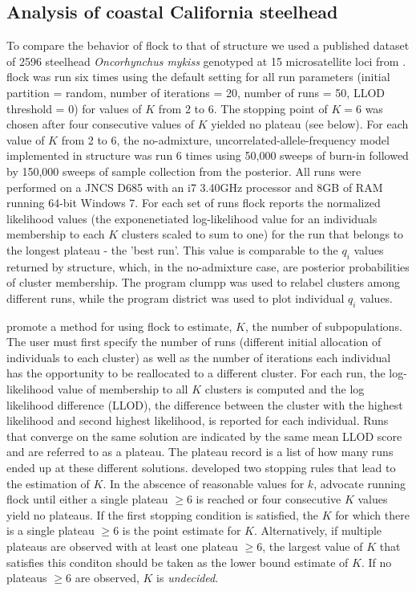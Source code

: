\subsection*{Analysis of coastal California steelhead} 
To compare the behavior of {\sc flock} to that of {\sc structure} we used a published 
dataset of 2596 steelhead \textit{Oncorhynchus mykiss}
genotyped at 15 microsatellite loci from \citet{Garzaetal_norcal}.  {\sc flock} 
was run six times using the default setting for all 
run parameters (initial partition = random, number of iterations = 20, number of runs = 50, 
LLOD threshold = 0) for values of $K$ from 2 to 6. The stopping point of 
$K=6$ was chosen after four consecutive values of $K$
yielded no plateau (see below). For each value of $K$ from 2 to 6, the no-admixture, 
uncorrelated-allele-frequency model implemented in {\sc structure} was run 6 times using 
50,000 sweeps of burn-in followed by 150,000 sweeps of sample collection from the posterior. 
All runs were performed on a JNCS D685 with an i7 3.40GHz processor and 8GB
of RAM running 64-bit Windows 7. For each set of runs {\sc flock} reports the 
normalized likelihood values (the exponenetiated log-likelihood value for an individuals 
membership to each $K$ clusters scaled to sum to one) for the run that belongs to 
the longest plateau - the 'best run'. 
This value is comparable to the $q_i$ values
returned by {\sc structure}, which, in the no-admixture case, are posterior probabilities of cluster membership.
The program {\sc clumpp} \citep{Jak&Ros2007} was used to relabel clusters among different runs,
while the program {\sc district} \citep{Rosenberg2004} was used to plot individual \textit{$q_i$} values. 

\citet{Duc&Tur2012} promote a method for using {\sc flock} to estimate, $K$, the number of
subpopulations. The user must first specify the number of runs (different initial allocation of individuals 
to each cluster) as well as the number of iterations each individual has the opportunity to be reallocated 
to a different cluster. For each run, the log-likelihood value of membership to all $K$ clusters is computed
and the log likelihood difference (LLOD), the difference between the cluster with the highest likelihood 
and second highest likelihood, is reported for each individual. Runs that converge on the same solution 
are indicated by the same mean LLOD score and 
are referred to as a plateau. The plateau record is a list of how many runs ended up at these different solutions. 
\citet{Duc&Tur2012} developed two stopping rules that lead to the estimation of $K$. In the abscence of 
reasonable values for $k$, \citet{Duc&Tur2012} advocate running  {\sc flock} until either a single plateau 
$\geq 6$  is reached or four consecutive $K$ values yield no plateaus. If the first stopping condition is satisfied,
the $K$ for which there is a single plateau $\geq 6$ is the point estimate for $K$. Alternatively, 
if multiple plateaus are observed with at least one plateau $\geq 6$, the largest value of $K$ that satisfies 
this conditon should be taken as the lower bound estimate of $K$. If no plateaus $\geq 6$ are observed, $K$
is \textit{undecided}.  


